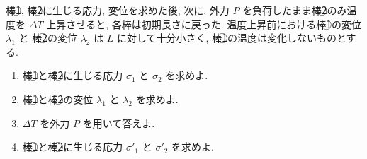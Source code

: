 棒\textcircled{1}, 棒\textcircled{2}に生じる応力, 変位を求めた後, 次に, 外力 $P$ を負荷したまま棒\textcircled{2}のみ温度を
$\Delta T$ 上昇させると, 各棒は初期長さに戻った. 温度上昇前における棒\textcircled{1}の変位 $\lambda_1$ と
棒\textcircled{2}の変位 $\lambda_2$ は $L$ に対して十分小さく, 棒\textcircled{1}の温度は変化しないものとする.

\begin{enumerate}[label=(\arabic*)]
  \item 棒\textcircled{1}と棒\textcircled{2}に生じる応力 $\sigma_1$ と $\sigma_2$ を求めよ.

  \item 棒\textcircled{1}と棒\textcircled{2}の変位 $\lambda_1$ と $\lambda_2$ を求めよ.

  \item $\Delta T$ を外力 $P$ を用いて答えよ.

  \item 棒\textcircled{1}と棒\textcircled{2}に生じる応力 $\sigma'_1$ と $\sigma'_2$ を求めよ.
\end{enumerate}
